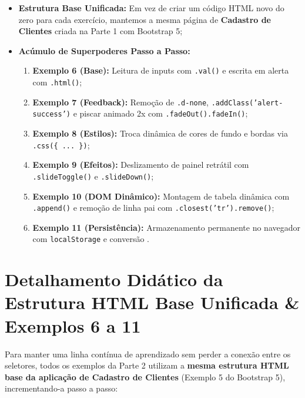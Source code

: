 \begin{itemize}
\item \textbf{Estrutura Base Unificada:} Em vez de criar um código HTML novo do zero para cada exercício, mantemos a mesma página de \textbf{Cadastro de Clientes} criada na Parte 1 com Bootstrap 5;
\item \textbf{Acúmulo de Superpoderes Passo a Passo:}
  \begin{enumerate}
    \item \textbf{Exemplo 6 (Base):} Leitura de inputs com \texttt{.val()} e escrita em alerta com \texttt{.html()};
    \item \textbf{Exemplo 7 (Feedback):} Remoção de \texttt{.d-none}, \texttt{.addClass('alert-success')} e piscar animado 2x com \texttt{.fadeOut().fadeIn()};
    \item \textbf{Exemplo 8 (Estilos):} Troca dinâmica de cores de fundo e bordas via \texttt{.css(\{ ... \})};
    \item \textbf{Exemplo 9 (Efeitos):} Deslizamento de painel retrátil com \texttt{.slideToggle()} e \texttt{.slideDown()};
    \item \textbf{Exemplo 10 (DOM Dinâmico):} Montagem de tabela dinâmica com \texttt{.append()} e remoção de linha pai com \texttt{.closest('tr').remove()};
    \item \textbf{Exemplo 11 (Persistência):} Armazenamento permanente no navegador com \texttt{localStorage} e conversão .
  \end{enumerate}
\end{itemize}


\section{Detalhamento Didático da Estrutura HTML Base Unificada \& Exemplos 6 a 11}

Para manter uma linha contínua de aprendizado sem perder a conexão entre os seletores, todos os exemplos da Parte 2 utilizam a \textbf{mesma estrutura HTML base da aplicação de Cadastro de Clientes} (Exemplo 5 do Bootstrap 5), incrementando-a passo a passo:

